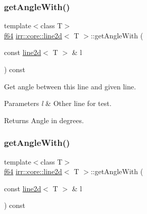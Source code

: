 \subsubsection{\texorpdfstring{get\+Angle\+With()}{getAngleWith()}\hspace{0.1cm}{\footnotesize\ttfamily [1/2]}}
{\footnotesize\ttfamily template$<$class T$>$ \\
\hyperlink{namespaceirr_a1325b02603ad449f92c68fc640af9b28}{f64} \hyperlink{classirr_1_1core_1_1line2d}{irr\+::core\+::line2d}$<$ T $>$\+::get\+Angle\+With (\begin{DoxyParamCaption}\item[{const \hyperlink{classirr_1_1core_1_1line2d}{line2d}$<$ T $>$ \&}]{l }\end{DoxyParamCaption}) const\hspace{0.3cm}{\ttfamily [inline]}}



Get angle between this line and given line. 


\begin{DoxyParams}{Parameters}
{\em l} & Other line for test. \\
\hline
\end{DoxyParams}
\begin{DoxyReturn}{Returns}
Angle in degrees. 
\end{DoxyReturn}
\mbox{\label{classirr_1_1core_1_1line2d_a0342a0b17c9318cb1eb1183cb91abaf4}} 
\subsubsection{\texorpdfstring{get\+Angle\+With()}{getAngleWith()}\hspace{0.1cm}{\footnotesize\ttfamily [2/2]}}
{\footnotesize\ttfamily template$<$class T$>$ \\
\hyperlink{namespaceirr_a1325b02603ad449f92c68fc640af9b28}{f64} \hyperlink{classirr_1_1core_1_1line2d}{irr\+::core\+::line2d}$<$ T $>$\+::get\+Angle\+With (\begin{DoxyParamCaption}\item[{const \hyperlink{classirr_1_1core_1_1line2d}{line2d}$<$ T $>$ \&}]{l }\end{DoxyParamCaption}) const\hspace{0.3cm}{\ttfamily [inline]}}



